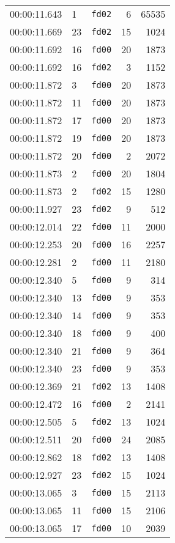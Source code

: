 \documentclass{article}
\begin{document}
\begin{longtable}{lllrr}
00:00:11.643 & 1 & \texttt{fd02} & 6 & 65535 \\
00:00:11.669 & 23 & \texttt{fd02} & 15 & 1024 \\
00:00:11.692 & 16 & \texttt{fd00} & 20 & 1873 \\
00:00:11.692 & 16 & \texttt{fd02} & 3 & 1152 \\
00:00:11.872 & 3 & \texttt{fd00} & 20 & 1873 \\
00:00:11.872 & 11 & \texttt{fd00} & 20 & 1873 \\
00:00:11.872 & 17 & \texttt{fd00} & 20 & 1873 \\
00:00:11.872 & 19 & \texttt{fd00} & 20 & 1873 \\
00:00:11.872 & 20 & \texttt{fd00} & 2 & 2072 \\
00:00:11.873 & 2 & \texttt{fd00} & 20 & 1804 \\
00:00:11.873 & 2 & \texttt{fd02} & 15 & 1280 \\
00:00:11.927 & 23 & \texttt{fd02} & 9 & 512 \\
00:00:12.014 & 22 & \texttt{fd00} & 11 & 2000 \\
00:00:12.253 & 20 & \texttt{fd00} & 16 & 2257 \\
00:00:12.281 & 2 & \texttt{fd00} & 11 & 2180 \\
00:00:12.340 & 5 & \texttt{fd00} & 9 & 314 \\
00:00:12.340 & 13 & \texttt{fd00} & 9 & 353 \\
00:00:12.340 & 14 & \texttt{fd00} & 9 & 353 \\
00:00:12.340 & 18 & \texttt{fd00} & 9 & 400 \\
00:00:12.340 & 21 & \texttt{fd00} & 9 & 364 \\
00:00:12.340 & 23 & \texttt{fd00} & 9 & 353 \\
00:00:12.369 & 21 & \texttt{fd02} & 13 & 1408 \\
00:00:12.472 & 16 & \texttt{fd00} & 2 & 2141 \\
00:00:12.505 & 5 & \texttt{fd02} & 13 & 1024 \\
00:00:12.511 & 20 & \texttt{fd00} & 24 & 2085 \\
00:00:12.862 & 18 & \texttt{fd02} & 13 & 1408 \\
00:00:12.927 & 23 & \texttt{fd02} & 15 & 1024 \\
00:00:13.065 & 3 & \texttt{fd00} & 15 & 2113 \\
00:00:13.065 & 11 & \texttt{fd00} & 15 & 2106 \\
00:00:13.065 & 17 & \texttt{fd00} & 10 & 2039 \\

\end{longtable}
\end{document}
